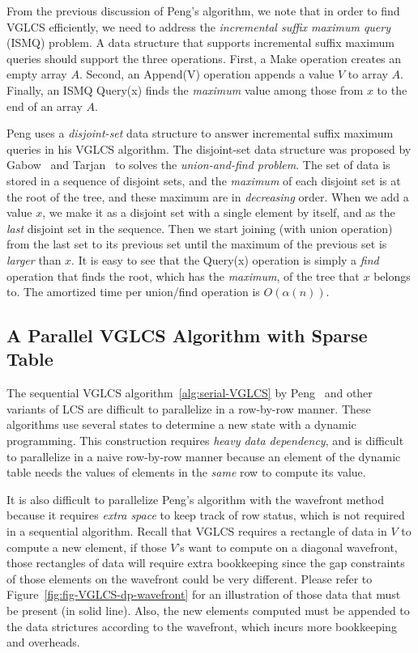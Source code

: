 From the previous discussion of Peng's algorithm, we note that in order
to find VGLCS efficiently, we need to address the {\em incremental
suffix maximum query} (ISMQ) problem.  A data structure that supports
incremental suffix maximum queries should support the three operations.
First, a {\sc Make} operation creates an empty array $A$. Second, an
{\sc Append(V)} operation appends a value $V$ to array $A$. Finally, an
ISMQ {\sc Query(x)} finds the {\em maximum} value among those from $x$
to the end of an array $A$.

Peng uses a {\em disjoint-set} data structure to answer incremental
suffix maximum queries in his VGLCS algorithm.  The disjoint-set data
structure was proposed by Gabow~\cite{Gabow1983ALA} and
Tarjan~\cite{Tarjan1975EfficiencyOA} to solves the {\em union-and-find
problem}.  The set of data is stored in a sequence of disjoint sets, and
the {\em maximum} of each disjoint set is at the root of the tree, and
these maximum are in {\em decreasing} order.  When we add a value $x$,
we make it as a disjoint set with a single element by itself, and as the
{\em last} disjoint set in the sequence.  Then we start joining (with
union operation) from the last set to its previous set until the maximum
of the previous set is {\em larger} than $x$. It is easy to see that the
{\sc Query(x)} operation is simply a {\em find} operation that finds the
root, which has the {\em maximum}, of the tree that $x$ belongs to.  The
amortized time per union/find operation is $O(\alpha(n))$.

\subsection{A Parallel VGLCS Algorithm with Sparse Table}

The sequential VGLCS algorithm~\ref{alg:serial-VGLCS} by
Peng~\cite{Peng2011TheLC} and other variants of LCS are difficult to
parallelize in a row-by-row manner.  These algorithms use several
states to determine a new state with a dynamic programming.  This
construction requires {\em heavy data dependency}, and is difficult to
parallelize in a naive row-by-row manner because an element of the
dynamic table needs the values of elements in the {\em same} row to
compute its value.

It is also difficult to parallelize Peng's algorithm with the wavefront
method because it requires {\em extra space} to keep track of row
status, which is not required in a sequential algorithm. Recall that
VGLCS requires a rectangle of data in $V$ to compute a new element, if
those $V$'s want to compute on a diagonal wavefront, those rectangles of
data will require extra bookkeeping since the gap constraints of those
elements on the wavefront could be very different.  Please refer to
Figure~\ref{fig:fig-VGLCS-dp-wavefront} for an illustration of those
data that must be present (in solid line).  Also, the new elements
computed must be appended to the data strictures according to the
wavefront, which incurs more bookkeeping and overheads.

